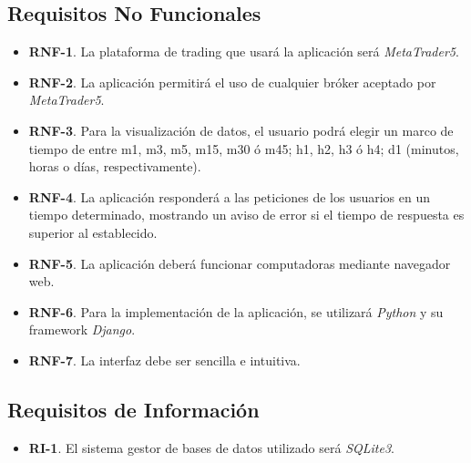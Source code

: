 \subsection{Requisitos No Funcionales}

\begin{itemize}
	\item \textbf{RNF-1}. La plataforma de trading que usará la aplicación será \textit{MetaTrader5}.
	\item \textbf{RNF-2}. La aplicación permitirá el uso de cualquier bróker aceptado por \textit{MetaTrader5}.
	\item \textbf{RNF-3}. Para la visualización de datos, el usuario podrá elegir un marco de tiempo de entre m1, m3, m5, m15, m30 ó m45; h1, h2, h3 ó h4; d1 (minutos, horas o días, respectivamente).
	\item \textbf{RNF-4}. La aplicación responderá a las peticiones de los usuarios en un tiempo determinado,
	mostrando un aviso de error si el tiempo de respuesta es superior al establecido.
	\item \textbf{RNF-5}. La aplicación deberá funcionar computadoras mediante navegador web.
	\item \textbf{RNF-6}. Para la implementación de la aplicación, se utilizará \textit{Python} y su framework \textit{Django}.
	\item \textbf{RNF-7}. La interfaz debe ser sencilla e intuitiva.
\end{itemize}

\subsection{Requisitos de Información}

\begin{itemize}
	\item \textbf{RI-1}. El sistema gestor de bases de datos utilizado será \textit{SQLite3}.
\end{itemize}

